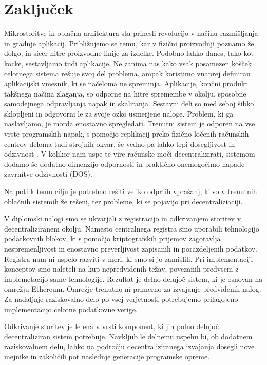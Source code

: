\documentclass[a4paper, 12pt]{book}
\begin{document}
\chapter{Zaključek}
\label{stroka}

Mikrostoritve in oblačna arhitektura sta prinesli revolucijo v načinu razmišljanja in gradnje aplikacij.
Približujemo se temu, kar v fizični proizvodnji poznamo že dolgo, in sicer hitre proizvodne linije za izdelke.
Podobno lahko danes, tako kot kocke, sestavljamo tudi aplikacije.
Ne zanima nas kako vsak posamezen košček celotnega sistema rešuje svoj del problema, ampak koristimo vnaprej definiran aplikacijski vmesnik, ki se načeloma ne spreminja.
Aplikacije, končni produkt takšnega načina zlaganja, so odporne na hitre spremembe v okolju, sposobne samodejnega odpravljanja napak in skaliranja.
Sestavni deli so med seboj šibko sklopljeni in odgovorni le za svoje ozko usmerjene naloge.
Problem, ki ga naslavljamo, je morda enostavno spregledati.
Trenutni sistem je odporen na vse vrste programskih napak, s pomočjo replikacij preko fizično ločenih računskih centrov deloma tudi strojnih okvar, še vedno pa lahko trpi dosegljivost in odzivnost \cite{awsFail}.
V kolikor nam uspe te vire računske moči decentralizirati, sistemom dodamo še dodatno dimenzijo odpornosti in praktično onemogočimo napade zavrnitve odzivnosti (DOS).

Na poti k temu cilju je potrebno rešiti veliko odprtih vprašanj, ki so v trenutnih oblačnih sistemih že rešeni, ter probleme, ki se pojavijo pri decentraliziaciji.

V diplomski nalogi smo se ukvarjali z registracijo in odkrivanjem storitev v decentraliziranem okolju.
Namesto centralnega registra smo uporabili tehnologijo podatkovnih blokov, ki s pomočjo kriptografskih prijemov zagotavlja nespremenljivost in enostavno preverljivost zapisanih in porazdeljenih podatkov.
Registra nam ni uspelo razviti v meri, ki smo si jo zamislili.
Pri implementaciji konceptov smo naleteli na kup nepredvidenih težav, povezanih predvsem z implemetacijo same tehnologije.
Rezultat je delno delujoč sistem, ki je osnovan na omrežju Ethereum.
Omrežje trenutno ni primerno za izvajanje predvidenih nalog.
Za nadaljnje raziskovalno delo po vsej verjetnosti potrebujemo prilagojeno implementacijo celotne podatkovne verige.

Odkrivanje storitev je le ena v vrsti komponent, ki jih polno delujoč decentraliziran sistem potrebuje.
Navkljub le delnemu uspehu bi, ob dodatnem raziskovalnem delu, lahko na področju decentraliziranega izvajanja dosegli nove mejnike in zakoličili pot naslednje generacije programske opreme.



\newpage %
\ \\
\clearpage
{}


\end{document}
